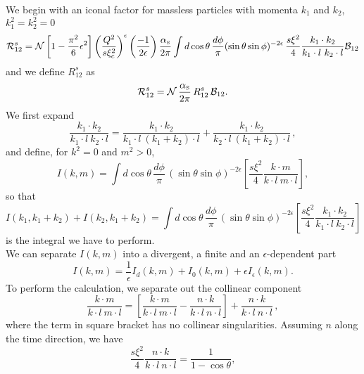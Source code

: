 \documentclass[paper]{JHEP3}
\newcommand\sss{\mathchoice%
{\displaystyle}%
{\scriptstyle}%
{\scriptscriptstyle}%
{\scriptscriptstyle}%
}
\newcommand\matR{{\cal R}}
\newcommand\as{\alpha_{\sss\rm S}}
\def\beq{\begin{equation}}
\def\eeq{\end{equation}}
\begin{document}
We begin with an iconal factor for massless particles with momenta $k_1$ and
$k_2$, $k_1^2 = k_2^2 = 0$
\begin{equation}
  \matR^s_{12} = \mathcal{N}  \left[ 1 - \frac{\pi^2}{6} \epsilon^2 \right]
  \left( 
  \frac{Q^2}{s \xi_c^2} \right)^{\epsilon} \left( \frac{- 1}{2 \epsilon}
  \right) \frac{\as}{2 \pi} \int d \cos \theta \, \frac{d \phi}{\pi} (\sin
  \theta \sin 
  \phi)^{- 2 \epsilon} \,\frac{s \xi^2 }{4} \frac{k_1 \cdot k_2}{k_1
  \cdot l \ k_2 \cdot l}  \mathcal{B}_{12} 
\end{equation}
and we define $R^s_{12}$ as
\beq
\matR^s_{12} = \mathcal{N} \, \frac{\as}{2 \pi} \,R^s_{12}\,\mathcal{B}_{12}. 
\eeq
We first expand
\begin{equation}
  \frac{k_1 \cdot k_2}{k_1 \cdot l\ k_2 \cdot l} = \frac{k_1 \cdot k_2}{k_1
  \cdot l\ (k_1 + k_2) \cdot l} + \frac{k_1 \cdot k_2}{k_2 \cdot l\ (k_1 + k_2)
  \cdot l}\,,
\end{equation}
and define, for $k^2 = 0$ and $m^2 > 0$,
\begin{equation}
  I (k, m) = \int d \cos \theta \,\frac{d \phi}{\pi}\, (\sin \theta \sin
  \phi)^{- 
  2 \epsilon}  \left[ \frac{s \xi^2}{4} \frac{k \cdot m}{k \cdot l\ m \cdot l}
  \right],
\end{equation}
 so that
\begin{equation}
  I (k_1, k_1 + k_2) + I (k_2, k_1 + k_2) = \int d \cos \theta \, \frac{d
  \phi}{\pi}\, (\sin \theta \sin \phi)^{- 2 \epsilon}  \left[ \frac{s \xi^2}{4}
  \frac{k_1 \cdot k_2}{k_1 \cdot l\ k_2 \cdot l} \right] 
\end{equation}
is the integral we have to perform.\\
We can separate $I (k, m)$ into a divergent, a finite and an $\epsilon$-dependent part
\begin{equation}
  I (k, m) = \frac{1}{\epsilon} I_d (k, m) + I_0 (k, m) + \epsilon
  I_{\epsilon} (k, m) .
\end{equation}
To perform the calculation, we separate out the collinear component
\begin{equation}
  \frac{k \cdot m}{k \cdot l\ m \cdot l} = \left[ \frac{k \cdot m}{k \cdot l\ m
  \cdot l} - \frac{n \cdot k}{k \cdot l\ n \cdot l} \right] + \frac{n \cdot
  k}{k \cdot l\ n \cdot l}\,,
\end{equation}
where the term in square bracket has no collinear singularities. Assuming $n$
along the time direction, we have
\begin{equation}
  \frac{s \xi^2}{4}  \frac{n \cdot k}{k \cdot l\ n \cdot l} = \frac{1}{1 -
  \cos \theta},
\end{equation}
\end{document}
